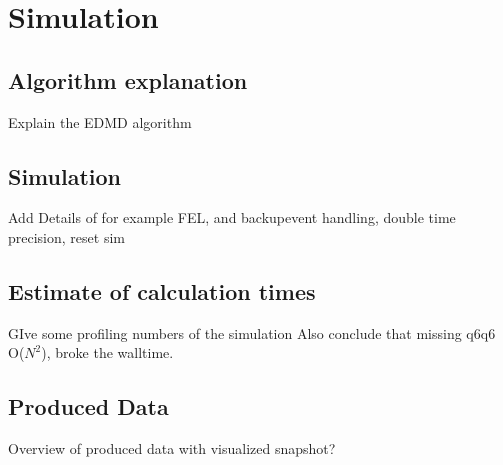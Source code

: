 
\section{Simulation}
\label{sec:simulation}

\subsection{Algorithm explanation}
Explain the EDMD algorithm

\subsection{Simulation}
Add Details of for example FEL, and backupevent handling, double time precision, reset sim

\subsection{Estimate of calculation times}
GIve some profiling numbers of the simulation
Also conclude that missing q6q6 O($N^2$), broke the walltime.

\subsection{Produced Data}
Overview of produced data with visualized snapshot?


